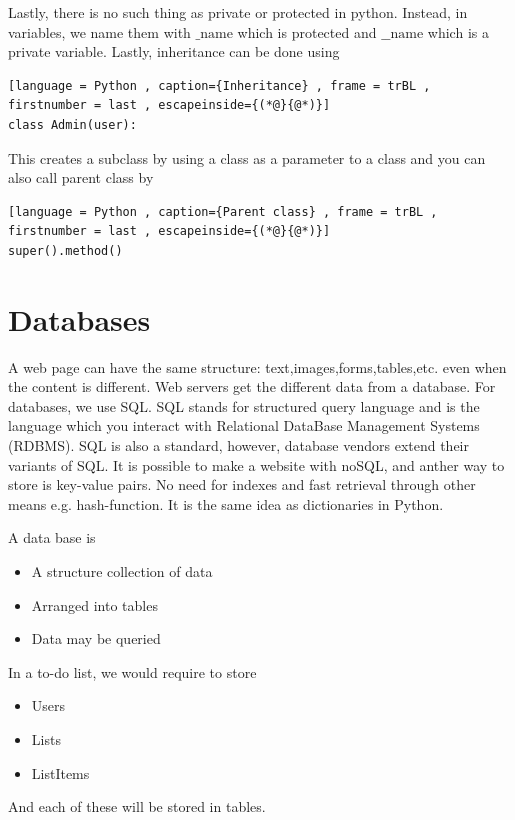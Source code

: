 \documentclass[a4paper]{article}
\theoremstyle{plain}
\theoremstyle{definition}
\newtheorem{defn}{Definition}[section]
\theoremstyle{remark}
\begin{document}
\begin{flushleft}
Lastly, there is no such thing as private or protected in python. Instead, in variables, we name them with $\_\text{name}$ which is protected and $\_\_\text{name}$ which is a private variable. Lastly, inheritance can be done using 
\begin{lstlisting}[language = Python , caption={Inheritance} , frame = trBL , firstnumber = last , escapeinside={(*@}{@*)}]
class Admin(user):
\end{lstlisting}
This creates a subclass by using a class as a parameter to a class and you can also call parent class by
\begin{lstlisting}[language = Python , caption={Parent class} , frame = trBL , firstnumber = last , escapeinside={(*@}{@*)}]
super().method()
\end{lstlisting}
\section{Databases}
A web page can have the same structure: text,images,forms,tables,etc. even when the content is different. Web servers get the different data from a database. For databases, we use SQL. SQL stands for structured query language and is the language which you interact with Relational DataBase Management Systems (RDBMS). SQL is also a standard, however, database vendors extend their variants of SQL. It is possible to make a website with noSQL, and anther way to store is key-value pairs. No need for indexes and fast retrieval through other means e.g. hash-function. It is the same idea as dictionaries in Python. 
\begin{tcolorbox}[colback=black!3!white,colframe=black!60!white,title=\begin{defn}Database \label{Database}\end{defn}]
A data base is
\begin{itemize}
	\item A structure collection of data
	\item Arranged into tables
	\item Data may be queried
\end{itemize}
\end{tcolorbox}
In a to-do list, we would require to store
\begin{itemize}
	\item Users
	\item Lists
	\item ListItems
\end{itemize}
And each of these will be stored in tables.

\end{flushleft}
\end{document}
